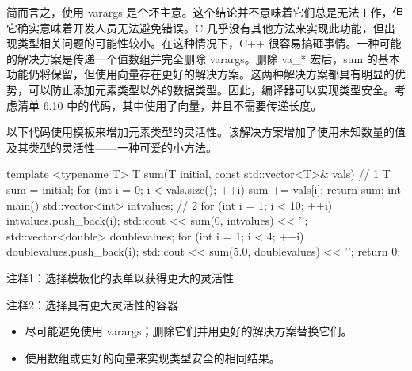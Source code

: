 
简而言之，使用 varargs 是个坏主意。这个结论并不意味着它们总是无法工作，但它确实意味着开发人员无法避免错误。C 几乎没有其他方法来实现此功能，但出现类型相关问题的可能性较小。在这种情况下，C++ 很容易搞砸事情。一种可能的解决方案是传递一个值数组并完全删除 varargs。删除 va\_* 宏后，sum 的基本功能仍将保留，但使用向量存在更好的解决方案。这两种解决方案都具有明显的优势，可以防止添加元素类型以外的数据类型。因此，编译器可以实现类型安全。考虑清单 6.10 中的代码，其中使用了向量，并且不需要传递长度。

以下代码使用模板来增加元素类型的灵活性。该解决方案增加了使用未知数量的值及其类型的灵活性——一种可爱的小方法。


\begin{cpp}
template <typename T>
T sum(T initial, const std::vector<T>& vals) { // 1
  T sum = initial;
  for (int i = 0; i < vals.size(); ++i)
    sum += vals[i];
  return sum;
}
int main() {
  std::vector<int> intvalues; // 2
  for (int i = 1; i < 10; ++i)
    intvalues.push_back(i);
  std::cout << sum(0, intvalues) << '\n';
  std::vector<double> doublevalues;
  for (int i = 1; i < 4; ++i)
    doublevalues.push_back(i);
  std::cout << sum(5.0, doublevalues) << '\n';
  return 0;
}
\end{cpp}

{\footnotesize
注释1：选择模板化的表单以获得更大的灵活性

注释2：选择具有更大灵活性的容器
}


\begin{itemize}
\item
尽可能避免使用 varargs；删除它们并用更好的解决方案替换它们。

\item
使用数组或更好的向量来实现类型安全的相同结果。
\end{itemize}
